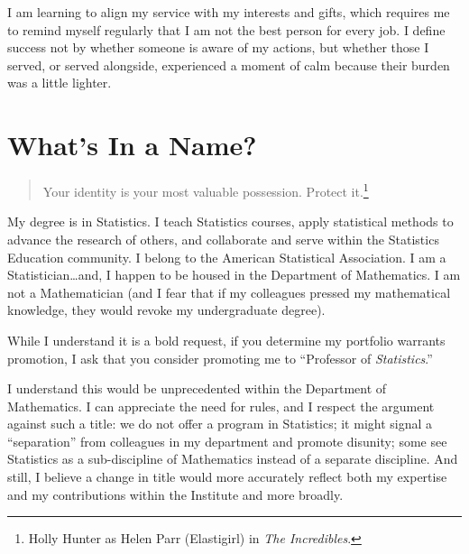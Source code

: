 \documentclass[
  letterpaper,
  DIV=11,
  numbers=noendperiod]{scrreprt}
\begin{document}
\begin{tcolorbox}[enhanced jigsaw, coltitle=black, colframe=quarto-callout-tip-color-frame, opacityback=0, rightrule=.15mm, bottomrule=.15mm, leftrule=.75mm, bottomtitle=1mm, colbacktitle=quarto-callout-tip-color!10!white, breakable, titlerule=0mm, title=\textcolor{quarto-callout-tip-color}{\faLightbulb}\hspace{0.5em}{Operating in Places that Complement My Interests and Gifts}, left=2mm, toptitle=1mm, toprule=.15mm, colback=white, arc=.35mm, opacitybacktitle=0.6]

I am learning to align my service with my interests and gifts, which
requires me to remind myself regularly that I am not the best person for
every job. I define success not by whether someone is aware of my
actions, but whether those I served, or served alongside, experienced a
moment of calm because their burden was a little lighter.

\end{tcolorbox}


\chapter{What's In a Name?}\label{whats-in-a-name}

\begin{quote}
Your identity is your most valuable possession. Protect it.\footnote{Holly
  Hunter as Helen Parr (Elastigirl) in \emph{The Incredibles}.}
\end{quote}

My degree is in Statistics. I teach Statistics courses, apply
statistical methods to advance the research of others, and collaborate
and serve within the Statistics Education community. I belong to the
American Statistical Association. I am a Statistician\ldots and, I
happen to be housed in the Department of Mathematics. I am not a
Mathematician (and I fear that if my colleagues pressed my mathematical
knowledge, they would revoke my undergraduate degree).

While I understand it is a bold request, if you determine my portfolio
warrants promotion, I ask that you consider promoting me to ``Professor
of \emph{Statistics}.''

I understand this would be unprecedented within the Department of
Mathematics. I can appreciate the need for rules, and I respect the
argument against such a title: we do not offer a program in Statistics;
it might signal a ``separation'' from colleagues in my department and
promote disunity; some see Statistics as a sub-discipline of Mathematics
instead of a separate discipline. And still, I believe a change in title
would more accurately reflect both my expertise and my contributions
within the Institute and more broadly.
\end{document}
